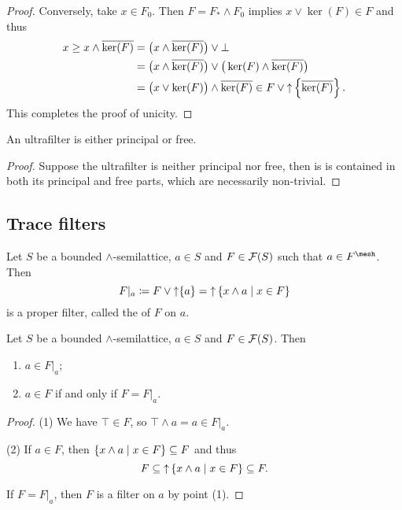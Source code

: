 \begin{proof}
Conversely, take $x\in F_0$. Then $F = F_*\wedge F_0$ implies $x\vee \ker(F) \in F$ and thus
\begin{align*}
x \geq x\wedge \overline{\ker(F)} &= \big(x\wedge \overline{\ker(F)}\big) \vee \bot \\
&= \big(x\wedge \overline{\ker(F)}\big) \vee \big(\ker(F) \wedge \overline{\ker(F)}\big) \\
&= \big(x\vee \ker(F)\big)\wedge \overline{\ker(F)} \in F\vee \operatorname{\uparrow}\left\{\overline{\ker(F)}\right\}.
\end{align*}
This completes the proof of unicity.
\end{proof}
\begin{corollary} \label{ultrafilterPrincipalOrFree}
An ultrafilter is either principal or free.
\end{corollary}
\begin{proof}
Suppose the ultrafilter is neither principal nor free, then is is contained in both its principal and free parts, which are necessarily non-trivial.
\end{proof}


\subsection{Trace filters}
\begin{definition}
Let $S$ be a bounded $\wedge$-semilattice, $a\in S$ and $F\in\operatorname{\mathcal{F}}(S)$ such that $a\in F^\mesh$.
Then
\[ F|_a \defeq F\vee \upset\{a\} = \upset\setbuilder{x\wedge a}{x\in F} \]
is a proper filter, called the  of $F$ on $a$.
\end{definition}

\begin{lemma} \label{traceFilterLemma}
Let $S$ be a bounded $\wedge$-semilattice, $a\in S$ and $F\in\operatorname{\mathcal{F}}(S)$. Then
\begin{enumerate}
\item $a\in F|_a$;
\item $a\in F$ \textup{if and only if} $F = F|_a$.
\end{enumerate}
\end{lemma}
\begin{proof}
(1) We have $\top \in F$, so $\top\wedge a = a \in F|_a$.

(2) If $a\in F$, then $\setbuilder{x\wedge a}{x\in F} \subseteq F$ and thus
\[ F \subseteq \upset\setbuilder{x\wedge a}{x\in F} \subseteq F. \]

If $F = F|_a$, then $F$ is a filter on $a$ by point (1).
\end{proof}

